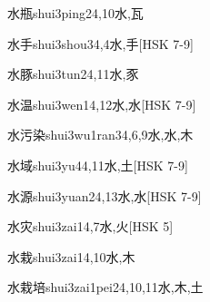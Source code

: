 \begin{EntryWithPhonetic}{水瓶}{shui3ping2}{4,10}{⽔,⽡}
\end{EntryWithPhonetic}

\begin{EntryWithPhonetic}{水手}{shui3shou3}{4,4}{⽔,⼿}[HSK 7-9]
\end{EntryWithPhonetic}

\begin{EntryWithPhonetic}{水豚}{shui3tun2}{4,11}{⽔,⾗}
\end{EntryWithPhonetic}

\begin{EntryWithPhonetic}{水温}{shui3wen1}{4,12}{⽔,⽔}[HSK 7-9]
\end{EntryWithPhonetic}

\begin{EntryWithPhonetic}{水污染}{shui3wu1ran3}{4,6,9}{⽔,⽔,⽊}
\end{EntryWithPhonetic}

\begin{EntryWithPhonetic}{水域}{shui3yu4}{4,11}{⽔,⼟}[HSK 7-9]
\end{EntryWithPhonetic}

\begin{EntryWithPhonetic}{水源}{shui3yuan2}{4,13}{⽔,⽔}[HSK 7-9]
\end{EntryWithPhonetic}

\begin{EntryWithPhonetic}{水灾}{shui3zai1}{4,7}{⽔,⽕}[HSK 5]
\end{EntryWithPhonetic}

\begin{EntryWithPhonetic}{水栽}{shui3zai1}{4,10}{⽔,⽊}
\end{EntryWithPhonetic}

\begin{EntryWithPhonetic}{水栽培}{shui3zai1pei2}{4,10,11}{⽔,⽊,⼟}
\end{EntryWithPhonetic}

